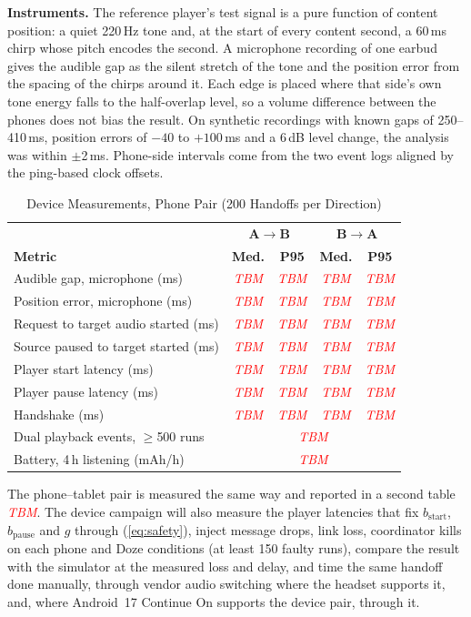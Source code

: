 \documentclass[conference]{IEEEtran}
\newcommand{\tbm}{\textcolor{red}{\textit{TBM}}}
\begin{document}
\textbf{Instruments.} The reference player's test signal is a pure function of content position: a quiet 220\,Hz tone and, at the start of every content second, a 60\,ms chirp whose pitch encodes the second. A microphone recording of one earbud gives the audible gap as the silent stretch of the tone and the position error from the spacing of the chirps around it. Each edge is placed where that side's own tone energy falls to the half-overlap level, so a volume difference between the phones does not bias the result. On synthetic recordings with known gaps of 250--410\,ms, position errors of $-40$ to $+100$\,ms and a 6\,dB level change, the analysis was within $\pm$2\,ms. Phone-side intervals come from the two event logs aligned by the ping-based clock offsets.

\begin{table}[t]
\caption{Device Measurements, Phone Pair (200 Handoffs per Direction)}
\label{tab:hw}
\centering
\footnotesize
\begin{tabular}{@{}lcccc@{}}
\toprule
 & \multicolumn{2}{c}{\textbf{A$\to$B}} & \multicolumn{2}{c}{\textbf{B$\to$A}} \\
\textbf{Metric} & \textbf{Med.} & \textbf{P95} & \textbf{Med.} & \textbf{P95} \\
\midrule
Audible gap, microphone (ms) & \tbm & \tbm & \tbm & \tbm \\
Position error, microphone (ms) & \tbm & \tbm & \tbm & \tbm \\
Request to target audio started (ms) & \tbm & \tbm & \tbm & \tbm \\
Source paused to target started (ms) & \tbm & \tbm & \tbm & \tbm \\
Player start latency (ms) & \tbm & \tbm & \tbm & \tbm \\
Player pause latency (ms) & \tbm & \tbm & \tbm & \tbm \\
Handshake (ms) & \tbm & \tbm & \tbm & \tbm \\
\midrule
Dual playback events, $\ge$500 runs & \multicolumn{4}{c}{\tbm} \\
Battery, 4\,h listening (mAh/h) & \multicolumn{4}{c}{\tbm} \\
\bottomrule
\end{tabular}
\end{table}

The phone--tablet pair is measured the same way and reported in a second table \tbm. The device campaign will also measure the player latencies that fix $b_{\mathrm{start}}$, $b_{\mathrm{pause}}$ and $g$ through (\ref{eq:safety}), inject message drops, link loss, coordinator kills on each phone and Doze conditions (at least 150 faulty runs), compare the result with the simulator at the measured loss and delay, and time the same handoff done manually, through vendor audio switching where the headset supports it, and, where Android~17 Continue On supports the device pair, through it.
\end{document}
